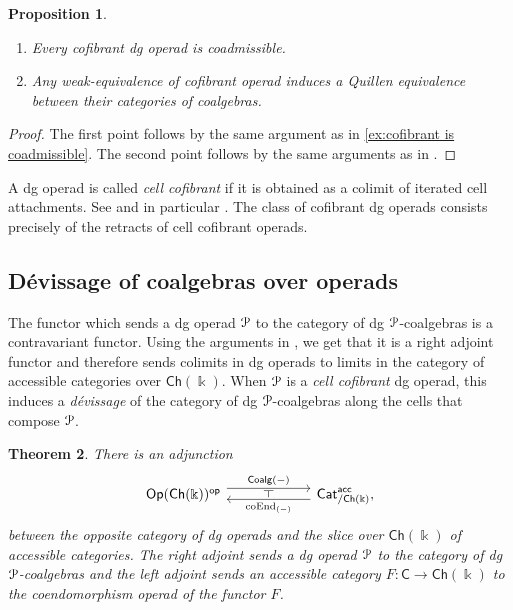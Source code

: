 \documentclass[a4paper,12pt]{amsart}
\renewcommand{\mathcal}{\EuScript}
\theoremstyle{plain}
\newtheorem{theorem}{Theorem}[section]
\newtheorem{proposition}[theorem]{Proposition}%
\theoremstyle{definition}
\theoremstyle{remark}
\newcommand{\kk}{\Bbbk}
\begin{document}
\begin{proposition}\label{prop: cofibrant operads are coadmissible}\leavevmode
\begin{enumerate}
\item Every cofibrant dg operad is coadmissible.
\item Any weak-equivalence of cofibrant operad induces a Quillen equivalence between their categories of coalgebras. 
\end{enumerate}
\end{proposition}

\begin{proof}
The first point follows by the same argument as in \cref{ex:cofibrant is coadmissible}. The second point follows by the same arguments as in \cite[Lemma 33 and Proposition 31]{premierpapier}. 
\end{proof}

A dg operad is called \textit{cell cofibrant} if it is obtained as a colimit of iterated cell attachments. See \cite[Section 12.2.1]{Fresse09} and in particular \cite[Proposition 12.2.3]{Fresse09}. The class of cofibrant dg operads consists precisely of the retracts of cell cofibrant operads. 

\subsection{Dévissage of coalgebras over operads}
The functor which sends a dg operad $\mathcal{P}$ to the category of dg $\mathcal{P}$-coalgebras is a contravariant functor. Using the arguments in \cite{DrummondColeHirshLejay20}, we get that it is a right adjoint functor and therefore sends colimits in dg operads to limits in the category of accessible categories over $\mathsf{Ch}(\kk)$. When $\mathcal{P}$ is a \textit{cell cofibrant} dg operad, this induces a \textit{dévissage} of the category of dg $\mathcal{P}$-coalgebras along the cells that compose $\mathcal{P}$. 

\begin{theorem}\label{thm: 1-categorical adjunction between categories of coalgebras and coendomorphism operads}
There is an adjunction \[
\begin{tikzcd}[column sep=5pc,row sep=3pc]
         \mathsf{Op}(\mathsf{Ch}(\kk))^{\mathsf{op}} \arrow[r, shift left=1.1ex, "\mathsf{Coalg}(-)"{name=F}] &\mathsf{Cat}^{\mathsf{acc}}_{/\mathsf{Ch}(\kk)}, \arrow[l, shift left=.75ex, "\mathrm{coEnd}_{(-)}"{name=U}]
            \arrow[phantom, from=F, to=U, , "\dashv" rotate=90]
\end{tikzcd}
\]between the opposite category of dg operads and the slice over $\mathsf{Ch}(\kk)$ of accessible categories. The right adjoint sends a dg operad $\mathcal{P}$ to the category of dg $\mathcal{P}$-coalgebras and the left adjoint sends an accessible category $F: \mathsf{C} \longrightarrow \mathsf{Ch}(\kk)$ to the coendomorphism operad of the functor $F$. 
\end{theorem}
\end{document}
